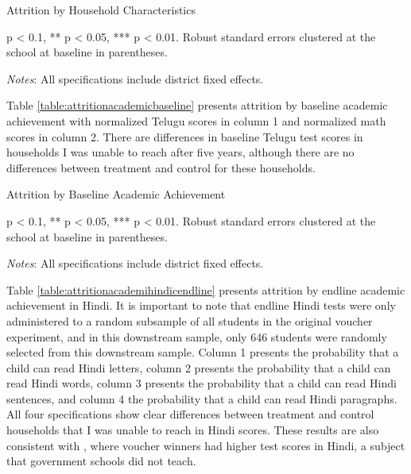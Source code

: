 \documentclass[hidelinks, 12pt, titlepage]{article}
\begin{document}
			\begin{table}[htb]
				\begin{threeparttable}
					\centering
					\caption{Attrition by Household Characteristics\label{table:attritionhousehold}}
					
					\begin{tablenotes}
						\item * p < 0.1, ** p < 0.05, *** p < 0.01. Robust standard errors clustered at the school at baseline in parentheses.
						\item \emph{Notes}: All specifications include district fixed effects.
					\end{tablenotes}
				\end{threeparttable}
			\end{table}

			Table \ref{table:attritionacademicbaseline} presents attrition by baseline academic achievement with normalized Telugu scores in column 1 and normalized math scores in column 2.  There are differences in baseline Telugu test scores in households I was unable to reach after five years, although there are no differences between treatment and control for these households.

			\begin{table}[htb]
				\begin{threeparttable}
					\centering
					\caption{Attrition by Baseline Academic Achievement\label{table:attritionacademicbaseline}}
					
					\begin{tablenotes}
						\item * p < 0.1, ** p < 0.05, *** p < 0.01. Robust standard errors clustered at the school at baseline in parentheses.
						\item \emph{Notes}: All specifications include district fixed effects.
					\end{tablenotes}
				\end{threeparttable}
			\end{table}

			Table \ref{table:attritionacademihindicendline} presents attrition by endline academic achievement in Hindi. It is important to note that endline Hindi tests were only administered to a random subsample of all students in the original voucher experiment, and in this downstream sample, only 646 students were randomly selected from this downstream sample.  Column 1 presents the probability that a child can read Hindi letters, column 2 presents the probability that a child can read Hindi words, column 3 presents the probability that a child can read Hindi sentences, and column 4 the probability that a child can read Hindi paragraphs.  All four specifications show clear differences between treatment and control households that I was unable to reach in Hindi scores.  These results are also consistent with \cite{Muralidharan2015}, where voucher winners had higher test scores in Hindi, a subject that government schools did not teach.
\end{document}
